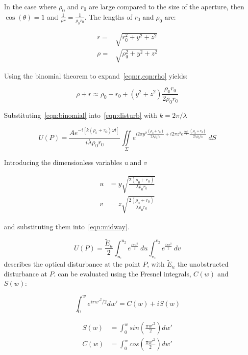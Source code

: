 In the case where $\rho_0$ and $r_0$ are large compared to the size of the aperture, then $\cos\left(\theta\right) = 1$ and $\tfrac{1}{\rho r}=\tfrac{1}{\rho_0 r_0}$.
The lengths of $r_0$ and $\rho_0$ are:

\begin{align}
r=&\sqrt{r_0^2+y^2+z^2}\label{eqn:r} \\
\rho=&\sqrt{\rho_0^2+y^2+z^2}\label{eqn:rho}
\end{align}

Using the binomial theorem to expand~\cref{eqn:r,eqn:rho} yields:

\begin{equation}
\rho + r \approx \rho_0 + r_0 + (y^2+z^2)\frac{\rho_0r_0}{2\rho_0r_0}
\label{eqn:binomial}
\end{equation}

Substituting~\cref{eqn:binomial} into~\cref{eqn:disturb} with $k=2\pi/\lambda$

\begin{equation}
U(P)=\frac{Ae^{-i[k(\rho_0+r_0)\omega t]}}{i\lambda\rho_0r_0}\iint\limits_{\Sigma} e^{i2\pi y^2\tfrac{(\rho_0+r_0)}{2\lambda\rho_0r_0}+i2\pi z^2e^{\frac{i\pi u^2}{2}}\tfrac{(\rho_0+r_0)}{2\lambda\rho_0r_0}} \ dS
\label{eqn:midway}
\end{equation}


Introducing the dimensionless variables \textit{u} and \textit{v}

\begin{align}
u&=y\sqrt{\frac{2(\rho_0+r_0)}{\lambda\rho_0r_0}}\\
v&=z\sqrt{\frac{2(\rho_0+r_0)}{\lambda\rho_0r_0}}
\end{align}

and substituting them into~\cref{eqn:midway}.

\begin{equation}
U(P)=\frac{\tilde{E}_u}{2}\int_{u_1}^{u_2} e^{\tfrac{i\pi u^2}{2}}\ du\int_{v_1}^{v_2} e^{\tfrac{i\pi v^2}{2}} \ dv
\label{eqn:pentdisturb}
\end{equation}
 describes the optical disturbance at the point $P$, with $\tilde{E}_u$ the unobstructed disturbance at $P$.
 can be evaluated using the Fresnel integrals, $C(w)$ and $S(w)$:


\begin{equation}
\int_{0}^{w}e^{i\pi w'^2/2}dw'=C(w)+iS(w)
\label{eqn:fresneleqn}
\end{equation}


\begin{align}
S(w)&=\int^w_0 sin\left(\frac{\pi w'^2}{2}\right)dw'\label{eqn:fresint1}\\
C(w)&=\int^w_0 cos\left(\frac{\pi w'^2}{2}\right)dw'\label{eqn:fresint2}
\end{align}


